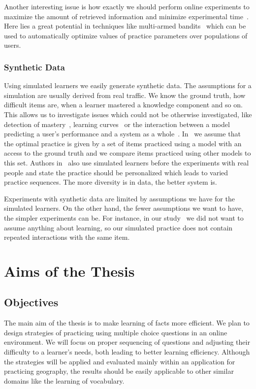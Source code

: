 \documentclass[table,color,cover,twoside,nolot,nolof]{fithesis3/fithesis3}
\begin{document}
Another interesting issue is how exactly we should perform online
experiments to maximize the amount of retrieved information and minimize
experimental time~\cite{liu2014towards}. Here lies a great potential in techniques
like multi-armed bandits~\cite{liu2014trading} which can be used to
automatically optimize values of practice parameters over populations of users.

\subsection{Synthetic Data}

Using simulated learners we easily generate synthetic data. The assumptions for
a simulation are usually derived from real traffic. We know the ground truth, how
difficult items are, when a learner mastered a knowledge component and so on.
This allows us to investigate issues which could not be otherwise investigated, like
detection of mastery~\cite{fancsali2013optimal}, learning
curves~\cite{fancsali2013simulated} or the interaction between a model
predicting a user's performance and a system as a
whole~\cite{niznan2015exploring}. In~\cite{niznan2015exploring} we assume that
the optimal practice is given by a set of items practiced using a model with an
access to the ground truth and we compare items practiced using other models to
this set. Authors in~\cite{lopes2015multi} also use simulated learners before
the experiments with real people and state the practice should be personalized
which leads to varied practice sequences. The more diversity is in data, the better
system is.

Experiments with synthetic data are limited by assumptions we have for the
simulated learners. On the other hand, the fewer assumptions we want to have,
the simpler experiments can be. For instance, in our
study~\cite{niznan2015exploring} we did not want to assume anything about
learning, so our simulated practice does not contain repeated interactions with
the same item.

\chapter{Aims of the Thesis}
\label{chapter:aims_of_the_thesis}

\section{Objectives}

The main aim of the thesis is to make learning of facts more
efficient. We plan to design strategies of practicing using multiple
choice questions in an online environment. We will focus on proper sequencing
of questions and adjusting their difficulty to a learner's needs, both leading
to better learning efficiency. Although the strategies will be applied and
evaluated mainly within an application for practicing geography, the results
should be easily applicable to other similar domains like the learning of
vocabulary.
\end{document}
